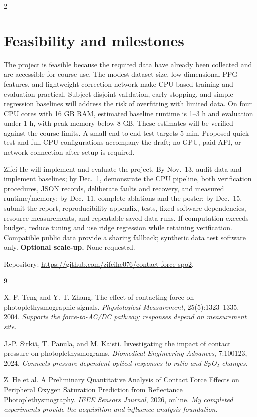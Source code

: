\documentclass[10pt]{article}
\begin{document}
\begin{multicols*}{2}
\section{Feasibility and milestones}
The project is feasible because the required data have already been collected and are accessible for course use. The modest dataset size, low-dimensional PPG features, and lightweight correction network make CPU-based training and evaluation practical. Subject-disjoint validation, early stopping, and simple regression baselines will address the risk of overfitting with limited data. On four CPU cores with 16 GB RAM, estimated baseline runtime is 1--3 h and evaluation under 1 h, with peak memory below 8 GB. These estimates will be verified against the course limits. A small end-to-end test targets 5 min. Proposed quick-test and full CPU configurations accompany the draft; no GPU, paid API, or network connection after setup is required.

Zifei He will implement and evaluate the project. By Nov.\ 13, audit data and implement baselines; by Dec.\ 1, demonstrate the CPU pipeline, both verification procedures, JSON records, deliberate faults and recovery, and measured runtime/memory; by Dec.\ 11, complete ablations and the poster; by Dec.\ 15, submit the report, reproducibility appendix, tests, fixed software dependencies, resource measurements, and repeatable saved-data runs. If computation exceeds budget, reduce tuning and use ridge regression while retaining verification. Compatible public data provide a sharing fallback; synthetic data test software only. \textbf{Optional scale-up.} None requested.

\noindent Repository: \url{https://github.com/zifeihe076/contact-force-spo2}.

\begin{thebibliography}{9}
\raggedright
{}
X. F. Teng and Y. T. Zhang.
The effect of contacting force on photoplethysmographic signals.
\textit{Physiological Measurement}, 25(5):1323--1335, 2004.
\textit{Supports the force-to-AC/DC pathway; responses depend on measurement site.}

J.-P. Sirkiä, T. Panula, and M. Kaisti.
Investigating the impact of contact pressure on photoplethysmograms.
\textit{Biomedical Engineering Advances}, 7:100123, 2024.
\textit{Connects pressure-dependent optical responses to ratio and SpO$_2$ changes.}

Z. He et al.
A Preliminary Quantitative Analysis of Contact Force Effects on Peripheral Oxygen Saturation Prediction from Reflectance Photoplethysmography.
\textit{IEEE Sensors Journal}, 2026, online.
\textit{My completed experiments provide the acquisition and influence-analysis foundation.}


\end{thebibliography}
\end{multicols*}
\end{document}
